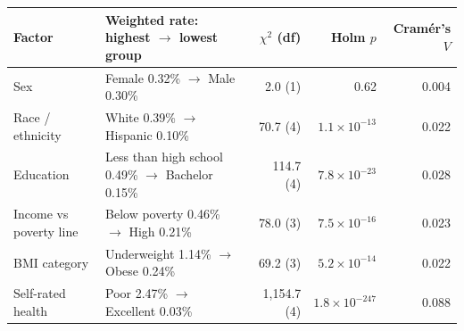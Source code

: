 \begin{tabularx}{\textwidth}{l >{\raggedright\arraybackslash}X r r r}
\toprule
Factor & Weighted rate: highest $\rightarrow$ lowest group & $\chi^2$ (df) & Holm $p$ & Cram\'er's $V$ \\
\midrule
Sex & Female 0.32\% $\rightarrow$ Male 0.30\% & 2.0 (1) & 0.62 & 0.004 \\
Race / ethnicity & White 0.39\% $\rightarrow$ Hispanic 0.10\% & 70.7 (4) & $1.1\times10^{-13}$ & 0.022 \\
Education & Less than high school 0.49\% $\rightarrow$ Bachelor 0.15\% & 114.7 (4) & $7.8\times10^{-23}$ & 0.028 \\
Income vs poverty line & Below poverty 0.46\% $\rightarrow$ High 0.21\% & 78.0 (3) & $7.5\times10^{-16}$ & 0.023 \\
BMI category & Underweight 1.14\% $\rightarrow$ Obese 0.24\% & 69.2 (3) & $5.2\times10^{-14}$ & 0.022 \\
Self-rated health & Poor 2.47\% $\rightarrow$ Excellent 0.03\% & 1,154.7 (4) & $1.8\times10^{-247}$ & 0.088 \\
\bottomrule
\end{tabularx}
